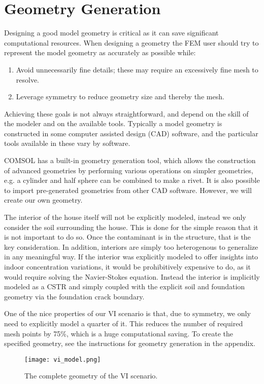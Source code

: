 \section{Geometry Generation}


Designing a good model geometry is critical as it can save significant computational resources.
When designing a geometry the FEM user should try to represent the model geometry as accurately as possible while:
\begin{enumerate}
  \item Avoid unnecessarily fine details; these may require an excessively fine mesh to resolve.
  \item Leverage symmetry to reduce geometry size and thereby the mesh.
\end{enumerate}\par
Achieving these goals is not always straightforward, and depend on the skill of the modeler and on the available tools.
Typically a model geometry is constructed in some computer assisted design (CAD) software, and the particular tools available in these vary by software.\par

COMSOL has a built-in geometry generation tool, which allows the construction of advanced geometries by performing various operations on simpler geometries, e.g. a cylinder and half sphere can be combined to make a rivet.
It is also possible to import pre-generated geometries from other CAD software.
However, we will create our own geometry.\par

The interior of the house itself will not be explicitly modeled, instead we only consider the soil surrounding the house.
This is done for the simple reason that it is not important to do so.
Once the contaminant is in the structure, that is the key consideration.
In addition, interiors are simply too heterogenous to generalize in any meaningful way.
If the interior was explicitly modeled to offer insights into indoor concentration variations, it would be prohibitively expensive to do, as it would require solving the Navier-Stokes equation.
Instead the interior is implicitly modeled as a CSTR and simply coupled with the explicit soil and foundation geometry via the foundation crack boundary.\par

One of the nice properties of our VI scenario is that, due to symmetry, we only need to explicitly model a quarter of it.
This reduces the number of required mesh points by 75\%, which is a huge computational saving.
To create the specified geometry, see the instructions for geometry generation in the appendix.

\begin{figure}[htb!]
  \texttt{[image: vi\_model.png]}
  \caption{The complete geometry of the VI scenario.}
  \label{fig:geometry}
\end{figure}
